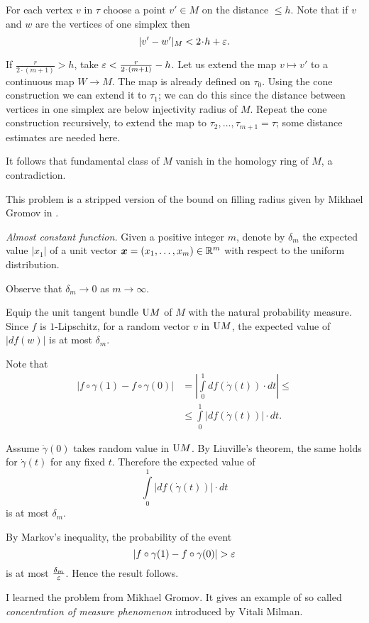 For each vertex $v$ in $\tau$ 
choose a point $v'\in M$ on the distance $\le h$.
Note that if $v$ and $w$ are the vertices of one simplex then
\[|v'-w'|_M<2\cdot h+\eps.\]

If $\tfrac{r}{2\cdot(m+1)}>h$, take $\eps<\tfrac{r}{2\cdot(m+1)}-h$.
Let us extend the map $v\mapsto v'$ 
to a continuous 
map $W\to M$.
The map is already defined on $\tau_0$.
Using the cone construction we can extend it to $\tau_1$;
we can do this since the distance between vertices in one simplex are below injectivity radius of $M$.
Repeat the cone construction recursively, to extend the map to $\tau_2,\dots,\tau_{m+1}=\tau$;
some distance estimates are needed here.

It follows that fundamental class of $M$ vanish in the homology ring of $M$, 
a contradiction.  

This problem is a stripped version of the bound on filling radius given by Mikhael Gromov in \cite{gromov-filling}.  

\textit{Almost constant function.}
Given a positive integer $m$,
denote by $\delta_m$ 
the expected value $|x_1|$ of a unit vector 
$\bm{x}=(x_1,\dots,x_m)\z\in\RR^m$ 
with respect to the uniform distribution.

Observe that $\delta_m\to 0$ as $m\to\infty$.

Equip the unit tangent bundle $\mathrm{U} M$ of $M$ with the natural probability measure.
Since $f$ is $1$-Lipschitz,
for a random vector $v$ in $\mathrm{U} M$,
the  expected value of $|df(w)|$
is at most $\delta_m$.

Note that 
\begin{align*}
|f\circ \gamma(1)-f\circ\gamma(0)|
&=
\left|\int\limits_0^1df(\dot\gamma(t))\cdot dt\right|\le \\
&\le \int\limits_0^1\left|df(\dot\gamma(t))\right|\cdot dt.
\end{align*}

Assume $\dot\gamma(0)$
takes random value in $\mathrm{U} M$.
By Liuville's theorem, the same holds for $\dot\gamma(t)$
for any fixed $t$.
Therefore
the expected value of
\[\int\limits_0^1|df(\dot\gamma(t))|\cdot dt\]
is at most $\delta_m$.

By Markov's inequality,
the probability of the event 
\[|f\circ \gamma(1)-f\circ\gamma(0)|>\eps\]
is at most $\tfrac{\delta_m}{\varepsilon}$.
Hence the result follows.


I learned the problem from Mikhael Gromov.
It gives an example 
of so called \emph{concentration of measure phenomenon}
introduced by Vitali Milman.
 
